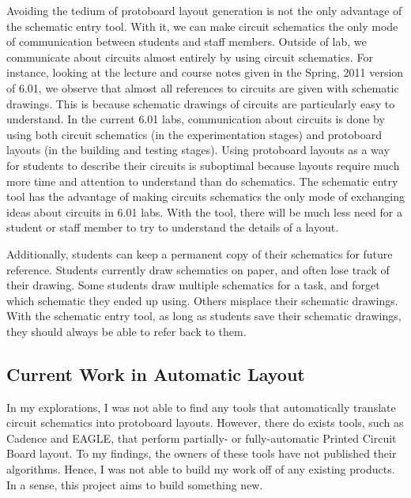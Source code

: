 Avoiding the tedium of protoboard layout generation is not the only advantage of
the schematic entry tool. With it, we can make circuit schematics the only mode
of communication between students and staff members. Outside of lab, we
communicate about circuits almost entirely by using circuit schematics. For
instance, looking at the lecture and course notes given in the Spring, 2011
version of 6.01\cite{ocw601}, we observe that almost all references to circuits
are given with schematic drawings. This is because schematic drawings of
circuits are particularly easy to understand. In the current 6.01 labs,
communication about circuits is done by using both circuit schematics (in the
experimentation stages) and protoboard layouts (in the building and testing
stages). Using protoboard layouts as a way for students to describe their
circuits is suboptimal because layouts require much more time and attention
to understand than do schematics. The schematic entry tool has the advantage of
making circuits schematics the only mode of exchanging ideas about circuits in
6.01 labs. With the tool, there will be much less need for a student or staff
member to try to understand the details of a layout.

Additionally, students can
keep a permanent copy of their schematics for future reference. Students
currently draw schematics on paper, and often lose track of their drawing. Some
students draw multiple schematics for a task, and forget which schematic
they ended up using. Others misplace their schematic drawings. With the
schematic entry tool, as long as students save their schematic drawings,
they should always be able to refer back to them.

\subsection{Current Work in Automatic Layout}
\label{sec:prev_layout}

In my explorations, I was not able to find any tools that
automatically translate circuit schematics into protoboard layouts.
However, there
do exists tools, such as Cadence\cite{cadence} and EAGLE\cite{eagle},
that perform partially- or fully-automatic Printed Circuit
Board layout. To my findings, the owners of these tools have not published
their algorithms. Hence, I was not able to build my
work off of any existing products. In a sense, this project aims to build
something new.
